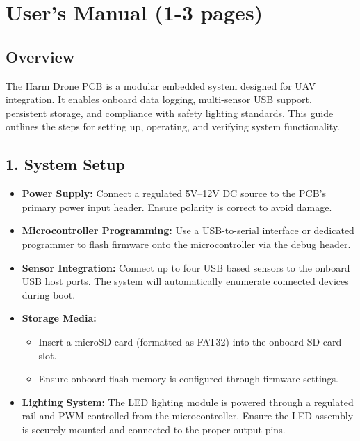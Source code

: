 \documentclass[12pt]{article}
\begin{document}
\section{User’s Manual (1-3 pages)}

\subsection*{Overview}
\par The Harm Drone PCB is a modular embedded system designed for UAV integration. It enables onboard data logging, multi-sensor USB support, persistent storage, and compliance with safety lighting standards. This guide outlines the steps for setting up, operating, and verifying system functionality.

\subsection*{1. System Setup}

\begin{itemize}
    \item \textbf{Power Supply:} Connect a regulated 5V–12V DC source to the PCB's primary power input header. Ensure polarity is correct to avoid damage.
    \item \textbf{Microcontroller Programming:} Use a USB-to-serial interface or dedicated programmer to flash firmware onto the microcontroller via the debug header.
    \item \textbf{Sensor Integration:} Connect up to four USB based sensors to the onboard USB host ports. The system will automatically enumerate connected devices during boot.
    \item \textbf{Storage Media:}
    \begin{itemize}
        \item Insert a microSD card (formatted as FAT32) into the onboard SD card slot.
        \item Ensure onboard flash memory is configured through firmware settings.
    \end{itemize}
    \item \textbf{Lighting System:} The LED lighting module is powered through a regulated rail and PWM controlled from the microcontroller. Ensure the LED assembly is securely mounted and connected to the proper output pins.
\end{itemize}
\end{document}
